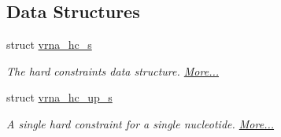 \subsection*{Data Structures}
\begin{DoxyCompactItemize}
\item 
struct \hyperlink{group__hard__constraints_structvrna__hc__s}{vrna\+\_\+hc\+\_\+s}
\begin{DoxyCompactList}\small\item\em The hard constraints data structure.  \hyperlink{group__hard__constraints_structvrna__hc__s}{More...}\end{DoxyCompactList}\item 
struct \hyperlink{group__hard__constraints_structvrna__hc__up__s}{vrna\+\_\+hc\+\_\+up\+\_\+s}
\begin{DoxyCompactList}\small\item\em A single hard constraint for a single nucleotide.  \hyperlink{group__hard__constraints_structvrna__hc__up__s}{More...}\end{DoxyCompactList}\end{DoxyCompactItemize}
